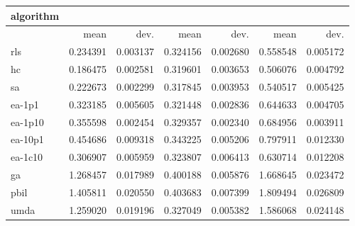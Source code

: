 \begin{tabular}{@{}l*{6}{>{{}}N{1}{2}}@{}}
\toprule
{algorithm} &  &  &  \\
\midrule
& {mean} & {dev.} & {mean} & {dev.} & {mean} & {dev.} \\
\midrule
rls & 0.234391 & 0.003137 & 0.324156 & 0.002680 & 0.558548 & 0.005172 \\
 hc & 0.186475 & 0.002581 & 0.319601 & 0.003653 & 0.506076 & 0.004792 \\
 sa & 0.222673 & 0.002299 & 0.317845 & 0.003953 & 0.540517 & 0.005425 \\
 ea-1p1 & 0.323185 & 0.005605 & 0.321448 & 0.002836 & 0.644633 & 0.004705 \\
 ea-1p10 & 0.355598 & 0.002454 & 0.329357 & 0.002340 & 0.684956 & 0.003911 \\
 ea-10p1 & 0.454686 & 0.009318 & 0.343225 & 0.005206 & 0.797911 & 0.012330 \\
 ea-1c10 & 0.306907 & 0.005959 & 0.323807 & 0.006413 & 0.630714 & 0.012208 \\
 ga & 1.268457 & 0.017989 & 0.400188 & 0.005876 & 1.668645 & 0.023472 \\
 pbil & 1.405811 & 0.020550 & 0.403683 & 0.007399 & 1.809494 & 0.026809 \\
 umda & 1.259020 & 0.019196 & 0.327049 & 0.005382 & 1.586068 & 0.024148 \\
 \bottomrule
\end{tabular}
